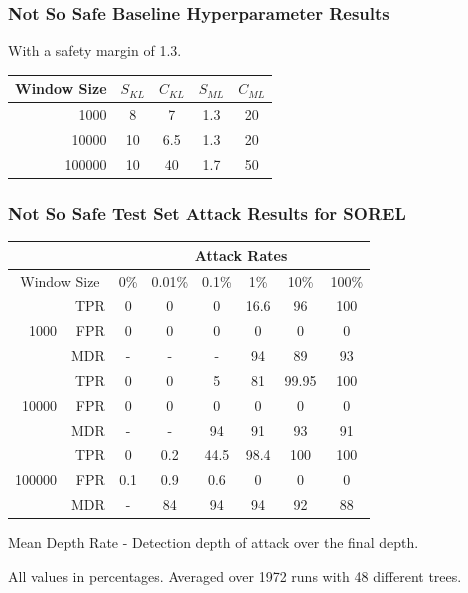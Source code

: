 \documentclass{beamer}
\begin{document}
\begin{frame}
    \frametitle{Not So Safe Baseline Hyperparameter Results}
    With a safety margin of 1.3.
    \begin{center}
        \begin{tabular}{| r | c c | c c |}
        \hline
        Window Size & $S_{KL}$ & $C_{KL}$ & $S_{ML}$ & $C_{ML}$ \\
        \hline 
        1000 & 8 & 7 & 1.3 & 20 \\
        \hline 
        10000 & 10 & 6.5 & 1.3 & 20 \\
        \hline 
        100000 & 10 & 40 & 1.7 & 50 \\
        \hline 
    \end{tabular}
    \end{center}
\end{frame}

\begin{frame}
    \frametitle{Not So Safe Test Set Attack Results for SOREL}
    \begin{center}
        \begin{tabular}{| r | r | c c c c c c |}
        \hline
         & & \multicolumn{6}{|c|}{Attack Rates} \\
        \hline
        \multicolumn{2}{|c|}{Window Size} & 0\% & 0.01\% & 0.1\% & 1\% & 10\% & 100\% \\
        \hline
        \multirow{3}{*}{1000} & TPR & 0 & 0 & 0 & 16.6 & 96 & 100 \\
                              & FPR & 0 & 0 & 0 &    0 &  0 &   0 \\
                              & MDR &   - &   - &   - &   94 & 89 &  93 \\
        \hline
        \multirow{3}{*}{10000} & TPR & 0 & 0 &  5 &  81 & 99.95 & 100 \\
                               & FPR & 0 & 0 &  0 &   0 &     0 &   0 \\
                               & MDR &   - &   - & 94 &  91 &    93 &  91 \\
        \hline
        \multirow{3}{*}{100000} & TPR &   0 & 0.2 & 44.5 & 98.4 & 100 & 100 \\
                                & FPR & 0.1 & 0.9 &  0.6 &    0 &   0 & 0 \\
                                & MDR &     - &  84 &   94 &   94 &  92 & 88 \\
        \hline
    \end{tabular}
    \end{center}
    Mean Depth Rate - Detection depth of attack over the final depth. 
    
    All values in percentages. Averaged over 1972 runs with 48 different trees.
\end{frame}
\end{document}

